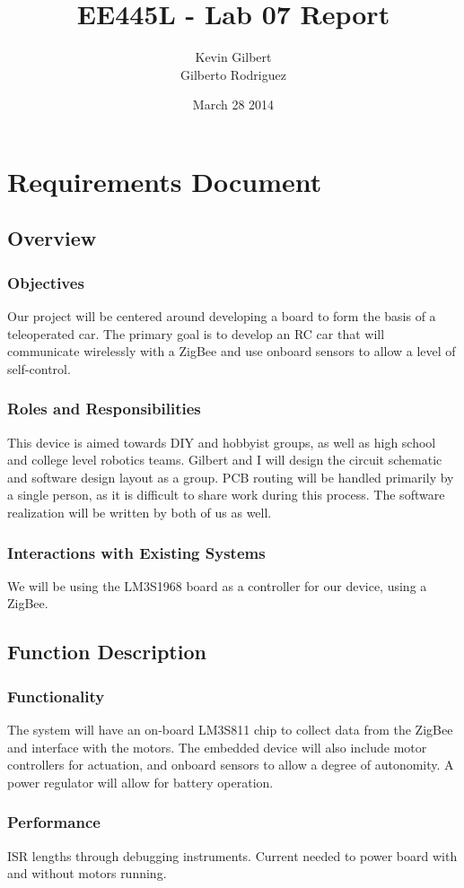 \documentclass[twoside]{article}
\title{EE445L - Lab 07 Report}
\author{Kevin Gilbert\\ Gilberto Rodriguez}
\date{March 28 2014}
\begin{document}
\raggedbottom
\maketitle{}

\section{Requirements Document}
\subsection{Overview}
\subsubsection{Objectives}
Our project will be centered around developing a board to form the basis of a teleoperated car. The primary goal is to develop an RC car that will communicate wirelessly with a ZigBee and use onboard sensors to allow a level of self-control.
\subsubsection{Roles and Responsibilities}
This device is aimed towards DIY and hobbyist groups, as well as high school and college level robotics teams. Gilbert and I will design the circuit schematic and software design layout as a group. PCB routing will be handled primarily by a single person, as it is difficult to share work during this process. The software realization will be written by both of us as well.
\subsubsection{Interactions with Existing Systems}
We will be using the LM3S1968 board as a controller for our device, using a ZigBee.
\subsection{Function Description}
\subsubsection{Functionality}
The system will have an on-board LM3S811 chip to collect data from the ZigBee and interface with the motors. The embedded device will also include motor controllers for actuation, and onboard sensors to allow a degree of autonomity. A power regulator will allow for battery operation.
\subsubsection{Performance}
ISR lengths through debugging instruments. Current needed to power board with and without motors running.
\end{document}
